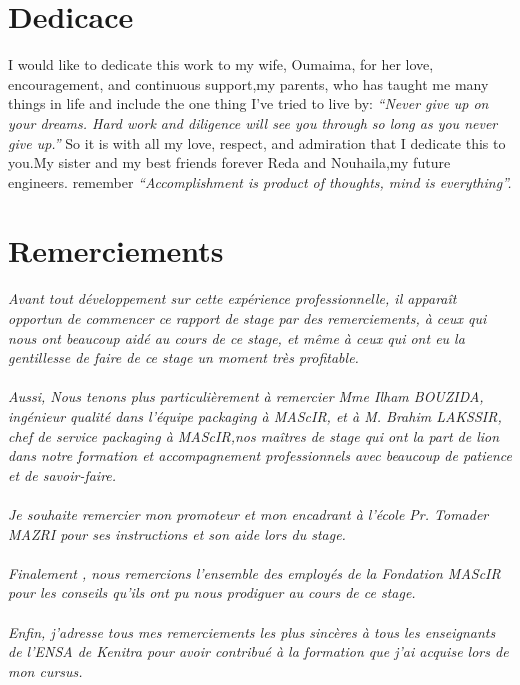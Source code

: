 \documentclass[11pt, a4paper, twoside]{book}
\author{Réalisé par : \\ Otmane BOUAYAD \vspace*{1truecm} \\ Encadré par : \\ Mme Ilham BOUZIDA : Encadrante professionnelle\\ }
\date{(Du 15 Fev au 25 Août  2016)}
\begin{document}
\maketitle
\pagestyle{plain}

\chapter*{Dedicace}

I would like to dedicate this work to my wife, Oumaima, for her love, encouragement, and continuous support,my parents, who has taught me many things in life and include the one thing I’ve tried to live by: 
\emph{“Never give up on your dreams. Hard work and diligence will see you through so long as you never give up.”}
 So it is with all my love, respect, and admiration that I dedicate this to you.My sister and my best friends forever Reda and Nouhaila,my future engineers. remember
\emph{“Accomplishment is product of thoughts, mind is everything”.}

\chapter*{Remerciements}
\emph{
Avant tout développement sur cette expérience professionnelle, il apparaît opportun 
de commencer ce rapport de stage par des remerciements, à ceux qui nous ont beaucoup 
aidé au cours de ce stage, et même à ceux qui ont eu la gentillesse de faire de ce stage un 
moment très profitable.\\\\}
\emph{
Aussi, Nous tenons plus particulièrement à remercier Mme Ilham
BOUZIDA, ingénieur qualité dans l’équipe packaging à MAScIR, et à M. Brahim LAKSSIR, chef de service packaging à MAScIR,nos maîtres de stage qui ont la part de lion dans notre formation et accompagnement professionnels avec beaucoup de patience et de savoir-faire.\\\\ }
\emph{Je souhaite remercier mon promoteur et mon encadrant à l'école Pr. Tomader MAZRI pour ses instructions et son aide lors du stage.\\\\}
\emph{
Finalement , nous remercions l’ensemble des employés de la Fondation MAScIR pour les conseils qu’ils ont pu nous prodiguer au cours de ce stage.
}\\\\
\emph{Enfin, j’adresse tous mes remerciements les plus sincères à tous les enseignants de l’ENSA de Kenitra pour avoir contribué à la formation que j’ai acquise lors de mon cursus.}
\tableofcontents
\end{document}
